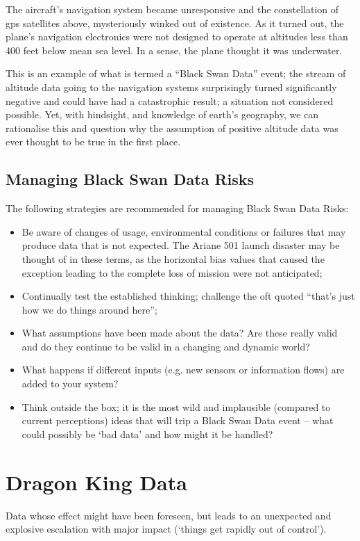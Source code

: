 The aircraft's navigation system became unresponsive and the constellation of \gls{gps} satellites above, mysteriously winked out of existence. As it turned out, the plane's navigation electronics were not designed to operate at altitudes less than 400 feet below mean sea level. In a sense, the plane thought it was underwater.

This is an example of what is termed a “Black Swan Data” event; the stream of altitude data going to the navigation systems surprisingly turned significantly negative and could have had a catastrophic result; a situation not considered possible. Yet, with hindsight, and knowledge of earth’s geography, we can rationalise this and question why the assumption of positive altitude data was ever thought to be true in the first place.

\subsection{Managing Black Swan Data Risks}
The following strategies are recommended for managing Black Swan Data Risks:
\begin{itemize}
\item Be aware of changes of usage, environmental conditions or failures that may produce data
that is not expected.
The Ariane 501 launch disaster may be thought of in these terms,
as the horizontal bias values that caused the exception leading to the complete loss of mission
were not anticipated;
\item Continually test the established thinking; challenge the oft quoted
“that’s just how we do things around here”;
\item What assumptions have been made about the data?
Are these really valid and do they continue to be valid in a changing and dynamic world?
\item What happens if different inputs (e.g. new sensors or \gls{information} flows)
are added to your system?
\item Think outside the box;
it is the most wild and implausible (compared to current perceptions)
ideas that will trip a Black Swan Data event --
what could possibly be ‘bad data’ and how might it be handled?
\end{itemize}

\section{Dragon King Data}
 Data whose effect might have been foreseen, but leads to an unexpected and explosive escalation
with major impact (‘things get rapidly out of control’).

